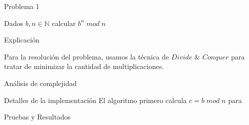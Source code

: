 \begin{section}{Problema 1}

	Dados $b,n \in \mathbb{N} $ calcular $b^n\; mod\; n$

	\begin{subsection}{Explicación}

		Para la resolución del problema, usamos la técnica de $Divide$ $\&$ $Conquer$ para tratar de minimizar la cantidad
	de multiplicaciones. 

		\begin{subsubsection}{Análisis de complejidad}
			

		\end{subsubsection}
	\end{subsection}

	\begin{subsection}{Detalles de la implementación}
		El algoritmo primero calcula $c = b\;mod\;n$ para 

	\end{subsection}

	\begin{subsection}{Pruebas y Resultados}

	\end{subsection}

\end{section}

